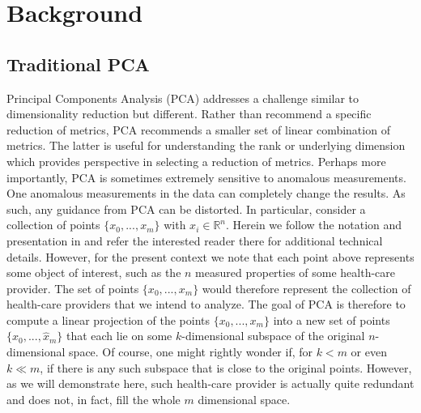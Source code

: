 \documentclass[conference]{IEEEtran}
\begin{document}
\section{Background}
\subsection{Traditional PCA} \label{PCA}

Principal Components Analysis (PCA) addresses a challenge similar to dimensionality reduction but different.  Rather than recommend a specific  reduction of metrics, PCA recommends a smaller set of linear combination of metrics.  The latter is useful for understanding the rank or underlying dimension which provides perspective in selecting a reduction of metrics. Perhaps more importantly,  PCA is sometimes extremely sensitive to anomalous measurements.  One anomalous measurements in the data can completely change the results.  As such, any guidance from PCA can be distorted.
In particular, consider a collection of
points $\{x_0,...,x_m\}$ with $x_i \in \mathbb{R}^n$.  Herein we follow the notation and presentation in \cite{paffenroth2018robust} and refer the interested reader there for additional technical details.  However, for the present context
we note that each point above represents some object  of interest, such as the $n$ measured properties of some health-care provider. The set of points $\{x_0,...,x_m\}$ would therefore
represent the collection of health-care providers that we intend to analyze.
The goal of PCA is therefore to compute a linear projection of the points $\{x_0,...,x_m\}$ into a new
set of points $\{\hat{x}_0,...,\hat{x}_m\}$ that each lie on some $k$-dimensional subspace of the original
$n$-dimensional space.  Of course, one might rightly wonder if, for $k < m$ or even $k \ll m$, if there is any 
such subspace that is close to the original points.  However, as we will demonstrate here, such health-care provider is
actually quite redundant and does not, in fact, fill the whole $m$ dimensional space.
\end{document}
